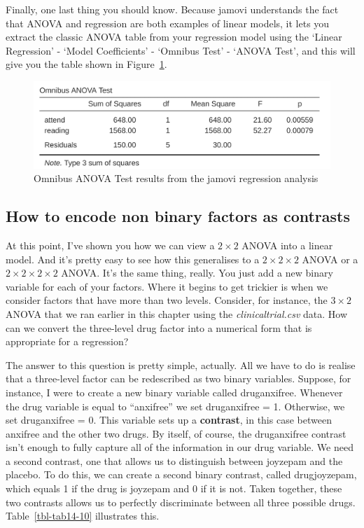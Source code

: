 \documentclass[
  a4paper,
]{book}
\begin{document}
Finally, one last thing you should know. Because jamovi understands the
fact that ANOVA and regression are both examples of linear models, it
lets you extract the classic ANOVA table from your regression model
using the `Linear Regression' - `Model Coefficients' - `Omnibus Test' -
`ANOVA Test', and this will give you the table shown in
Figure~\ref{fig-fig14-19}.

\begin{figure}

\includegraphics[width=1\textwidth,height=\textheight]{images/fig14-19.png} \hfill{}

\caption{\label{fig-fig14-19}Omnibus ANOVA Test results from the jamovi
regression analysis}

\end{figure}

\hypertarget{how-to-encode-non-binary-factors-as-contrasts}{%
\subsection{How to encode non binary factors as
contrasts}\label{how-to-encode-non-binary-factors-as-contrasts}}

At this point, I've shown you how we can view a \(2 \times 2\) ANOVA
into a linear model. And it's pretty easy to see how this generalises to
a \(2 \times 2 \times 2\) ANOVA or a \(2 \times 2 \times 2 \times 2\)
ANOVA. It's the same thing, really. You just add a new binary variable
for each of your factors. Where it begins to get trickier is when we
consider factors that have more than two levels. Consider, for instance,
the \(3 \times 2\) ANOVA that we ran earlier in this chapter using the
\emph{clinicaltrial.csv} data. How can we convert the three-level drug
factor into a numerical form that is appropriate for a regression?

The answer to this question is pretty simple, actually. All we have to
do is realise that a three-level factor can be redescribed as two binary
variables. Suppose, for instance, I were to create a new binary variable
called druganxifree. Whenever the drug variable is equal to ``anxifree''
we set druganxifree = 1. Otherwise, we set druganxifree = 0. This
variable sets up a \textbf{contrast}, in this case between anxifree and
the other two drugs. By itself, of course, the druganxifree contrast
isn't enough to fully capture all of the information in our drug
variable. We need a second contrast, one that allows us to distinguish
between joyzepam and the placebo. To do this, we can create a second
binary contrast, called drugjoyzepam, which equals 1 if the drug is
joyzepam and 0 if it is not. Taken together, these two contrasts allows
us to perfectly discriminate between all three possible drugs.
Table~\ref{tbl-tab14-10} illustrates this.
\end{document}

